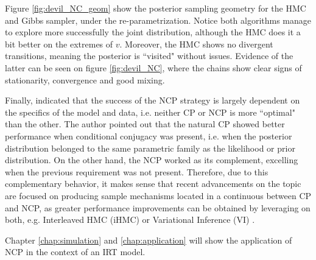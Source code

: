 Figure \ref{fig:devil_NC_geom} show the posterior sampling geometry for the HMC and Gibbs sampler, under the re-parametrization. Notice both algorithms manage to explore more successfully the joint distribution, although the HMC does it a bit better on the extremes of $v$. Moreover, the HMC shows no divergent transitions, meaning the posterior is ``visited" without issues. Evidence of the latter can be seen on figure \ref{fig:devil_NC}, where the chains show clear signs of stationarity, convergence and good mixing.

Finally, \citet{Papaspiliopoulos_et_al_2007} indicated that the success of the NCP strategy is largely dependent on the specifics of the model and data, i.e. neither CP or NCP is more ``optimal" than the other. The author pointed out that the natural CP showed better performance when conditional conjugacy was present, i.e. when the posterior distribution belonged to the same parametric family as the likelihood or prior distribution. On the other hand, the NCP worked as its complement, excelling when the previous requirement was not present. Therefore, due to this complementary behavior, it makes sense that recent advancements on the topic are focused on producing sample mechanisms located in a continuous between CP and NCP, as greater performance improvements can be obtained by leveraging on both, e.g. Interleaved HMC (iHMC) or Variational Inference (VI) \cite{Gelfand_et_al_1995, Gelfand_et_al_1996, Papaspiliopoulos_et_al_2003, Papaspiliopoulos_et_al_2007, Gorinova_et_al_2019}.

Chapter \ref{chap:simulation} and \ref{chap:application} will show the application of NCP in the context of an IRT model.

